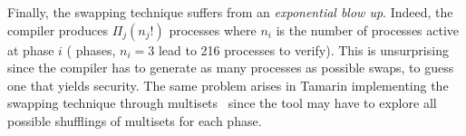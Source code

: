       Finally, the swapping technique suffers from an {\em exponential blow up}.
    Indeed, the compiler produces $\Pi_j (n_j!)$ processes where $n_i$
    is the number of processes active at phase $i$ ( phases,
    $n_i=3$ lead to 216 processes to verify).  This is unsurprising
    since the compiler has to generate as many processes as possible
    swaps, to guess one that yields security.
    The same problem arises in Tamarin implementing the swapping technique through multisets~\cite{dreier2017beyond}
    since the tool may have to explore all possible shufflings of multisets for each phase.

% 
% 
% 
% 
% 
% 
%
